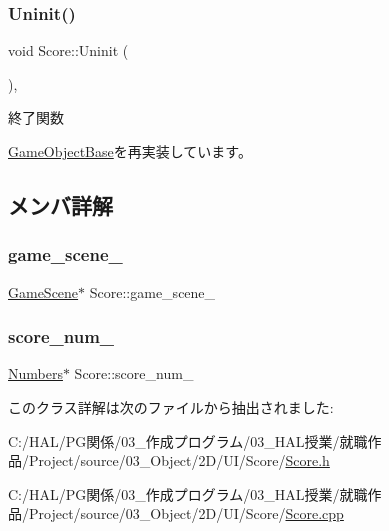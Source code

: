 \subsubsection{\texorpdfstring{Uninit()}{Uninit()}}
{\footnotesize\ttfamily void Score\+::\+Uninit (\begin{DoxyParamCaption}{ }\end{DoxyParamCaption})\hspace{0.3cm}{\ttfamily [override]}, {\ttfamily [virtual]}}



終了関数 



\mbox{\hyperlink{class_game_object_base_a97e1bc277d7b1c0156d4735de29a022c}{Game\+Object\+Base}}を再実装しています。



\subsection{メンバ詳解}
\mbox{\label{class_score_ada5a957b01fbed0c1bb52cea4e1bcbc4}} 
\subsubsection{\texorpdfstring{game\+\_\+scene\+\_\+}{game\_scene\_}}
{\footnotesize\ttfamily \mbox{\hyperlink{class_game_scene}{Game\+Scene}}$\ast$ Score\+::game\+\_\+scene\+\_\+}

\mbox{\label{class_score_a5d178c5581627f1fa4c06f95f9558dcd}} 
\subsubsection{\texorpdfstring{score\+\_\+num\+\_\+}{score\_num\_}}
{\footnotesize\ttfamily \mbox{\hyperlink{class_numbers}{Numbers}}$\ast$ Score\+::score\+\_\+num\+\_\+}



このクラス詳解は次のファイルから抽出されました\+:\begin{DoxyCompactItemize}
\item 
C\+:/\+H\+A\+L/\+P\+G関係/03\+\_\+作成プログラム/03\+\_\+\+H\+A\+L授業/就職作品/\+Project/source/03\+\_\+\+Object/2\+D/\+U\+I/\+Score/\mbox{\hyperlink{_score_8h}{Score.\+h}}\item 
C\+:/\+H\+A\+L/\+P\+G関係/03\+\_\+作成プログラム/03\+\_\+\+H\+A\+L授業/就職作品/\+Project/source/03\+\_\+\+Object/2\+D/\+U\+I/\+Score/\mbox{\hyperlink{_score_8cpp}{Score.\+cpp}}\end{DoxyCompactItemize}
